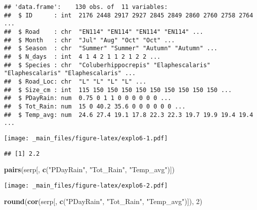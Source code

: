 \documentclass[
]{book}
\newenvironment{Shaded}{\begin{snugshade}}{\end{snugshade}}
\newcommand{\DecValTok}[1]{\textcolor[rgb]{0.00,0.00,0.81}{#1}}
\newcommand{\KeywordTok}[1]{\textcolor[rgb]{0.13,0.29,0.53}{\textbf{#1}}}
\newcommand{\NormalTok}[1]{#1}
\newcommand{\OperatorTok}[1]{\textcolor[rgb]{0.81,0.36,0.00}{\textbf{#1}}}
\newcommand{\StringTok}[1]{\textcolor[rgb]{0.31,0.60,0.02}{#1}}
\begin{document}
\begin{verbatim}
## 'data.frame':    130 obs. of  11 variables:
##  $ ID      : int  2176 2448 2917 2927 2845 2849 2860 2760 2758 2764 ...
##  $ Road    : chr  "EN114" "EN114" "EN114" "EN114" ...
##  $ Month   : chr  "Jul" "Aug" "Oct" "Oct" ...
##  $ Season  : chr  "Summer" "Summer" "Autumn" "Autumn" ...
##  $ N_days  : int  4 1 4 2 1 1 2 1 2 2 ...
##  $ Species : chr  "Coluberhippocrepis" "Elaphescalaris" "Elaphescalaris" "Elaphescalaris" ...
##  $ Road_Loc: chr  "L" "L" "L" "L" ...
##  $ Size_cm : int  115 150 150 150 150 150 150 150 150 150 ...
##  $ PDayRain: num  0.75 0 1 1 0 0 0 0 0 0 ...
##  $ Tot_Rain: num  15 0 40.2 35.6 0 0 0 0 0 0 ...
##  $ Temp_avg: num  24.6 27.4 19.1 17.8 22.3 22.3 19.7 19.9 19.4 19.4 ...
\end{verbatim}

\begin{Shaded}
\end{Shaded}

\texttt{[image: \_main\_files/figure-latex/explo6-1.pdf]}

\begin{Shaded}
\end{Shaded}

\begin{verbatim}
## [1] 2.2
\end{verbatim}

\begin{Shaded}
\begin{Highlighting}[]
\KeywordTok{pairs}\NormalTok{(serp[, }\KeywordTok{c}\NormalTok{(}\StringTok{"PDayRain"}\NormalTok{, }\StringTok{"Tot_Rain"}\NormalTok{, }\StringTok{"Temp_avg"}\NormalTok{)])}
\end{Highlighting}
\end{Shaded}

\texttt{[image: \_main\_files/figure-latex/explo6-2.pdf]}

\begin{Shaded}
\begin{Highlighting}[]
\KeywordTok{round}\NormalTok{(}\KeywordTok{cor}\NormalTok{(serp[, }\KeywordTok{c}\NormalTok{(}\StringTok{"PDayRain"}\NormalTok{, }\StringTok{"Tot_Rain"}\NormalTok{, }\StringTok{"Temp_avg"}\NormalTok{)]), }\DecValTok{2}\NormalTok{)}
\end{Highlighting}
\end{Shaded}
\end{document}

